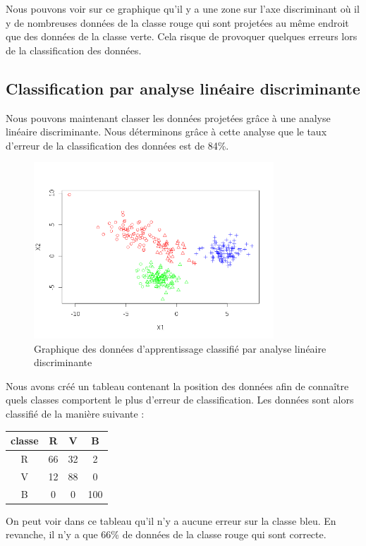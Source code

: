 \documentclass[a4paper,11pt]{article}
\begin{document}
  Nous pouvons voir sur ce graphique qu'il y a une zone sur l'axe discriminant où il y de nombreuses
  données de la classe rouge qui sont projetées au même endroit que des données de la classe verte.
  Cela risque de provoquer quelques erreurs lors de la classification des données.
  
  \subsection{Classification par analyse linéaire discriminante}
  
  Nous pouvons maintenant classer les données projetées grâce à une analyse linéaire discriminante. Nous 
  déterminons grâce à cette analyse que le taux d'erreur de la classification des données est de 84\%.
  
  \begin{figure}[H]
  \center
   \includegraphics[width=9cm]{apprentissage_classifie.png}
   \caption{Graphique des données d'apprentissage classifié par analyse linéaire discriminante}
  \end{figure}

  Nous avons créé un tableau contenant la position des données afin de connaître quels classes
  comportent le plus d'erreur de classification. Les données sont alors classifié de la manière suivante :
  \begin{center}
  \begin{tabular}{|c|c|c|c|}
   \hline
   classe & R & V & B\\
   \hline
   R & 66 & 32 & 2 \\
   \hline
   V & 12 & 88 & 0 \\
   \hline
   B & 0 & 0 & 100 \\
   \hline
  \end{tabular}
  \end{center}

  On peut voir dans ce tableau qu'il n'y a aucune erreur sur la classe bleu. En revanche, il n'y a que 66\%
  de données de la classe rouge qui sont correcte.\\
  
\end{document}
